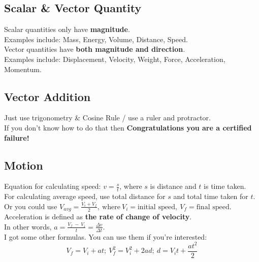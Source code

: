 \documentclass[a4paper,12pt]{article}
\begin{document}
\subsection{Scalar \& Vector Quantity}
Scalar quantities only have \textbf{magnitude}. \\Examples include: Mass, Energy, Volume, Distance, Speed. \\Vector quantities have \textbf{both magnitude and direction}.\\ Examples include: Displacement, Velocity, Weight, Force, Acceleration, Momentum. 
\subsection{Vector Addition}
Just use trigonometry \& Cosine Rule / use a ruler and protractor. \\If you don't know how to do that then \textbf{Congratulations you are a certified failure!}
\subsection{Motion}
Equation for calculating speed: \(v=\frac{s}t\), where \(s\) is distance and \(t\) is time taken. \\
For calculating average speed, use total distance for \(s\) and total time taken for \(t\).\\
Or you could use \(V_{avg}=\frac{V_i+V_f}{2},\ \text{where}\ V_i=\text{initial speed},\ V_f=\text{final speed}\).\\
Acceleration is defined as \textbf{the rate of change of velocity}.\\ In other words, \(a=\frac{V_f\ -\ V_i}{t}=\frac{\Delta v}{\Delta t}\).\\
I got some other formulas. You can use them if you're interested:\\
\[V_f=V_i+at;\ V_f^2=V_i^2+2ad;\ d=V_it+\frac{at^2}{2}\]
\end{document}
